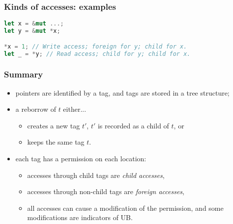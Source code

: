 \begin{frame}[fragile]
    \frametitle{Kinds of accesses: examples}
    \begin{block}{}
        \begin{lstlisting}[language=rust]
let x = &mut ...;
let y = &mut *x;

*x = 1; // Write access; foreign for y; child for x.
let _ = *y; // Read access; child for y; child for x.
        \end{lstlisting}
    \end{block}
    \begin{block}{}
        \centering
    \end{block}
\end{frame}

\begin{frame}
    \frametitle{Summary}
    \begin{itemize}
        \item pointers are identified by a tag, and tags are stored in a tree structure;
        \item a reborrow of \(t\) either...
            \begin{itemize}
                \item creates a new tag \(t'\), \(t'\) is recorded as a child of \(t\), or
                \item keeps the same tag \(t\).
            \end{itemize}
        \item each tag has a permission on each location:
            \begin{itemize}
                \item accesses through child tags are \textit{child accesses},
                \item accesses through non-child tags are \textit{foreign accesses},
                \item all accesses can cause a modification of the permission, and some modifications are indicators of UB.
            \end{itemize}
    \end{itemize}
\end{frame}
